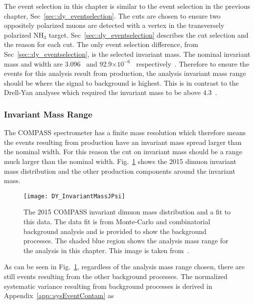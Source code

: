 The event selection in this chapter is similar to the event selection in the
previous chapter, Sec~\ref{sec::dy_eventselection}.  The cuts are chosen to
ensure two oppositely polarized muons are detected with a vertex in the
transversely polarized NH$_3$ target.  Sec~\ref{sec::dy_eventselection}
describes the cut selection and the reason for each cut.  The only event
selection difference, from Sec~\ref{sec::dy_eventselection}, is the selected
invariant mass.  The nominal {\jp} invariant mass and width are 3.096~{\gvcw}
and 92.9$\times10^{-6}$~{\gvcw} respectively~\cite{Tanabashi:2018oca}.
Therefore to ensure the events for this analysis result from {\jp} production,
the analysis invariant mass range should be where the {\jp} signal to background
is highest.  This is in contrast to the Drell-Yan analyses which required the
invariant mass to be above 4.3~{\gvcw}.

\subsubsection{{\jp} Invariant Mass Range}\label{sec::jpMassRange}
The COMPASS spectrometer has a finite mass resolution which therefore means the
events resulting from {\jp} production have an invariant mass spread larger than
the nominal {\jp} width.  For this reason the cut on invariant mass should be a
range much larger than the nominal {\jp} width.
Fig.~\ref{fig::DY_InvariantMassJPsi} shows the 2015 dimuon invariant mass
distribution and the other production components around the {\jp} invariant
mass.

\begin{figure}[h!t]
  \centering \texttt{[image: DY\_InvariantMassJPsi]}
  \caption{The 2015 COMPASS invariant dimuon mass distribution and a fit to this
    data.  The data fit is from Monte-Carlo and combinatorial background
    analysis and is provided to show the background processes.  The shaded blue
    region shows the analysis mass range for the analysis in this chapter.  This
    image is taken from~\cite{compassDYpaper}.}
  \label{fig::DY_InvariantMassJPsi}
\end{figure}

As can be seen in Fig.~\ref{fig::DY_InvariantMassJPsi}, regardless of the
analysis mass range chosen, there are still events resulting from the other
background processes.  The normalized systematic variance resulting from
background processes is derived in Appendix~\ref{app::sysEventContam} as


